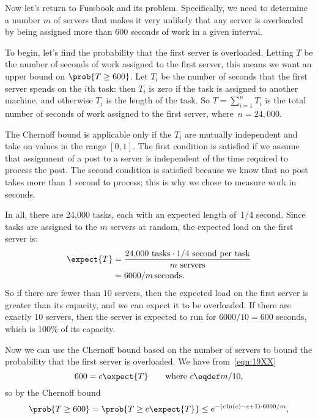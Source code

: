 Now let's return to Fussbook and its  problem.
Specifically, we need to determine a number $m$ of servers that
makes it very unlikely that any server is overloaded by being assigned
more than 600 seconds of work in a given interval.

To begin, let's find the probability that the first server is
overloaded.  Letting $T$ be the number of seconds of work assigned to
the first server, this means we want an upper bound on $\prob{T \geq
  600}$.  Let $T_i$ be the number of seconds that the first server
spends on the $i$th task: then $T_i$ is zero if the task is assigned
to another machine, and otherwise $T_i$ is the length of the task.  So
$T = \sum_{i = 1}^n T_i$ is the total number of seconds of work
assigned to the first server, where~$n = 24{,}000$.

The Chernoff bound is applicable only if the $T_i$ are mutually
independent and take on values in the range $[0, 1]$.  The first
condition is satisfied if we assume that assignment of a post to a
server is independent of the time required to process the post.  The
second condition is satisfied because we know that no post takes more
than 1 second to process; this is why we chose to measure work in
seconds.

In all, there are 24,000 tasks, each with an expected length of~1/4
second.  Since tasks are assigned to the $m$ servers at random, the
expected load on the first server is:
\begin{align}
\expect{T} & = \frac{24{,}000 \mbox{ tasks} \cdot 1/4 \mbox{ second per task}}
  {m \mbox{ servers}} \notag\\
  & = 6000 / m\,\text{seconds}.
\label{eqn:19XX}
\end{align}
So if there are fewer than $10$ servers, then the expected
load on the first server is greater than its capacity, and we can
expect it to be overloaded.  If there are exactly 10 servers, then the
server is expected to run for $6000/10 = 600$ seconds, which is 100\%
of its capacity.

Now we can use the Chernoff bound based on the number of servers to
bound the probability that the first server is overloaded.  We have
from~\eqref{eqn:19XX}
\[
600 = c \expect{T}  \qquad \text{where } c \eqdef m/10,
\]
so by the Chernoff bound
\begin{align*}
\prob{T \geq 600} = \prob{T \geq c \expect{T}} \leq e^{-(c \ln(c) - c + 1) \cdot 6000 / m},
\end{align*}

